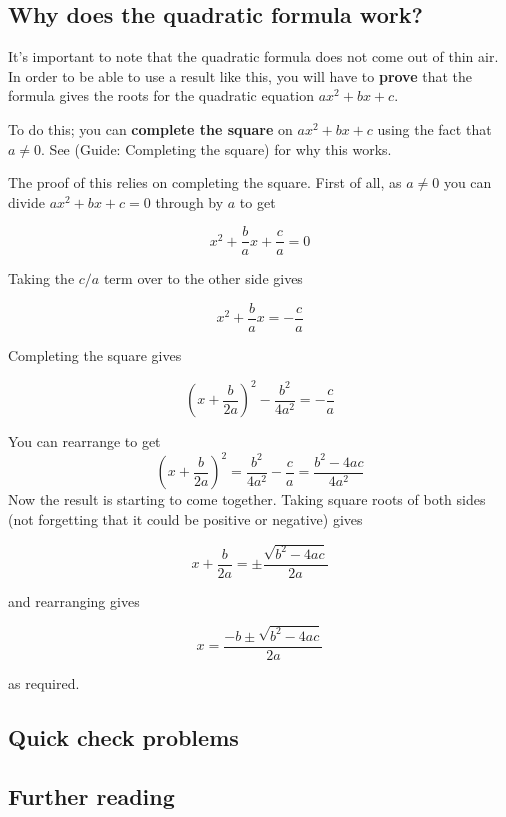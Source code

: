 \documentclass[
  12pt,
  a4paper, oneside]{starmastarticle}
\begin{document}
\hypertarget{why-does-the-quadratic-formula-work}{%
\subsection*{Why does the quadratic formula
work?}\label{why-does-the-quadratic-formula-work}}

It's important to note that the quadratic formula does not come out of
thin air. In order to be able to use a result like this, you will have
to \textbf{prove} that the formula gives the roots for the quadratic
equation \(ax^2 + bx + c\).

To do this; you can \textbf{complete the square} on \(ax^2 + bx + c\)
using the fact that \(a\neq 0\). See (Guide: Completing the square) for
why this works.

\begin{tcolorbox}[enhanced jigsaw, toprule=.15mm, opacityback=0, bottomrule=.15mm, arc=.35mm, left=2mm, rightrule=.15mm, breakable, leftrule=.75mm, colframe=quarto-callout-note-color-frame, colback=white]
\begin{minipage}[t]{5.5mm}
\textcolor{quarto-callout-note-color}{\faInfo}
\end{minipage}%
\begin{minipage}[t]{\textwidth - 5.5mm}
The proof of this relies on completing the square. First of all, as
\(a\neq 0\) you can divide \(ax^2 + bx + c = 0\) through by \(a\) to get

\[x^2 + \frac{b}{a} x + \frac{c}{a} = 0\]

Taking the \(c/a\) term over to the other side gives

\[x^2 + \frac{b}{a} x = -\frac{c}{a}\]

Completing the square gives

\[\left(x + \frac{b}{2a}\right)^2 - \frac{b^2}{4a^2} = -\frac{c}{a}\]

You can rearrange to get
\[\left(x + \frac{b}{2a}\right)^2 = \frac{b^2}{4a^2} - \frac{c}{a} = \frac{b^2 - 4ac}{4a^2}\]
Now the result is starting to come together. Taking square roots of both
sides (not forgetting that it could be positive or negative) gives

\[x + \frac{b}{2a} = \pm\frac{\sqrt{b^2 - 4ac}}{2a}\]

and rearranging gives

\[x = \frac{-b \pm \sqrt{b^2 - 4ac}}{2a}\]

as required.\end{minipage}%
\end{tcolorbox}

\hypertarget{quick-check-problems}{%
\subsection*{Quick check problems}\label{quick-check-problems}}

\hypertarget{further-reading}{%
\subsection*{Further reading}\label{further-reading}}
\end{document}
